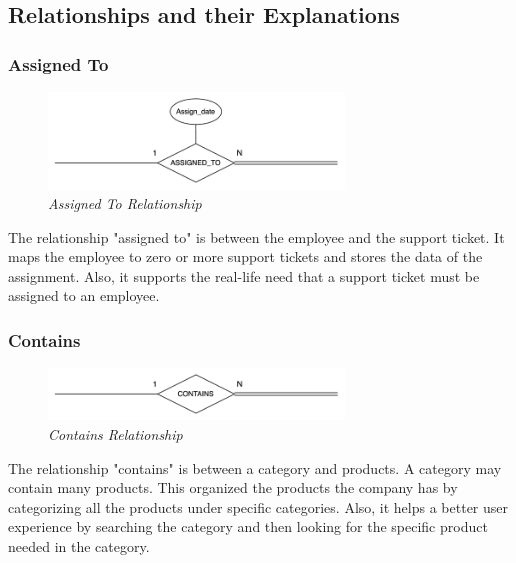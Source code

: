 \subsection{Relationships and their Explanations}

\subsubsection{Assigned To}
\begin{figure}[H]
  \centering
  \includegraphics[width=0.7\textwidth]{images/relationships/assigned_to.png}
  \caption{\textit{Assigned To Relationship}}
\end{figure}

The relationship "assigned to" is between the employee and the support ticket. It maps the employee to zero or more support tickets and stores the data of the assignment. Also, it supports the real-life need that a support ticket must be assigned to an employee.

\subsubsection{Contains}
\begin{figure}[H]
  \centering
  \includegraphics[width=0.7\textwidth]{images/relationships/contains.png}
  \caption{\textit{Contains Relationship}}
\end{figure}

The relationship "contains" is between a category and products. A category may contain many products. This organized the products the company has by categorizing all the products under specific categories. Also, it helps a better user experience by searching the category and then looking for the specific product needed in the category.

